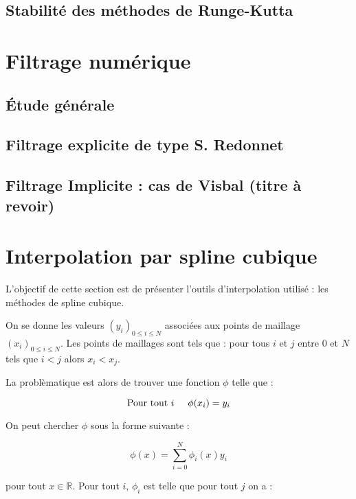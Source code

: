 \subsection{Stabilité des méthodes de Runge-Kutta}


\section{Filtrage numérique}

\subsection{\'Etude générale}

\subsection{Filtrage explicite de type S. Redonnet}

\subsection{Filtrage Implicite : cas de Visbal (titre à revoir)}


\section{Interpolation par spline cubique}

L'objectif de cette section est de présenter l'outils d'interpolation utilisé : les méthodes de spline cubique.

On se donne les valeurs $(y_i)_{0 \leq i \leq N}$ associées aux points de maillage $(x_i)_{0 \leq i \leq N}$. Les points de maillages sont tels que : pour tous $i$ et $j$ entre $0$ et $N$ tels que $i < j$ alors $x_i < x_j$.

La problèmatique est alors de trouver une fonction $\phi$ telle que :

\begin{equation}
\text{Pour tout } i \hspace{0.5cm}   \phi(x_i) = y_i
\end{equation}

On peut chercher $\phi$ sous la forme suivante :

\begin{equation}
\phi (x) = \sum_{i=0}^N \phi_i(x) y_i
\label{eq:interpolation fct caract}
\end{equation}

pour tout $x \in \mathbb{R}$. Pour tout $i$, $\phi_i$ est telle que pour tout $j$ on a :

